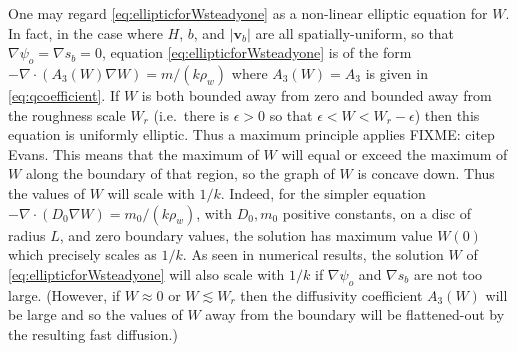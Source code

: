 \documentclass[gmd]{copernicus}   %
\newcommand\bv{\mathbf{v}}
\newcommand{\Div}{\nabla\cdot}
\newcommand\eps{\epsilon}
\newcommand{\grad}{\nabla}
\begin{document}
One may regard \eqref{eq:ellipticforWsteadyone} as a non-linear elliptic equation for $W$.  In fact, in the case where $H$, $b$, and $|\bv_b|$ are all spatially-uniform, so that $\grad \psi_o = \grad s_b = 0$, equation \eqref{eq:ellipticforWsteadyone} is of the form $-\Div \left(A_3(W) \grad W\right) = m/(k \rho_w)$ where $A_3(W) = A_3$ is given in \eqref{eq:qcoefficient}.  If $W$ is both bounded away from zero and bounded away from the roughness scale $W_r$ (i.e.~there is $\eps>0$ so that $\eps < W < W_r-\eps$) then this equation is uniformly elliptic.  Thus a maximum principle applies FIXME: citep Evans.  This means that the maximum of $W$ will equal or exceed the maximum of $W$ along the boundary of that region, so the graph of $W$ is concave down.  Thus the values of $W$ will scale with $1/k$.  Indeed, for the simpler equation $-\Div \left(D_0 \grad W\right) = m_0/(k \rho_w)$, with $D_0,m_0$ positive constants, on a disc of radius $L$, and zero boundary values, the solution has maximum value $W(0)$ which precisely scales as $1/k$.  As seen in numerical results, the solution $W$ of \eqref{eq:ellipticforWsteadyone} will also scale with $1/k$ if $\grad \psi_o$ and $\grad s_b$ are not too large.  (However, if $W\approx 0$  or $W\lesssim W_r$ then the diffusivity coefficient $A_3(W)$ will be large and so the values of $W$ away from the boundary will be flattened-out by the resulting fast diffusion.)


\end{document}
